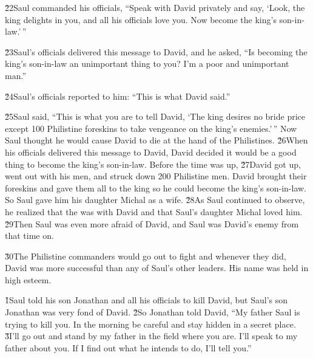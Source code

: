 \v{22}Saul commanded his officials, ``Speak with David privately and say, `Look, the king delights in you, and all his officials love you. Now become the king's son-in-law.'\,''

\v{23}Saul's officials delivered this message to David, and he asked, ``Is becoming the king's son-in-law an unimportant thing to you? I'm a poor and unimportant man.''

\v{24}Saul's officials reported to him: ``This is what David said.''

\v{25}Saul said, ``This is what you are to tell David, `The king desires no bride price except 100 Philistine foreskins to take vengeance on the king's enemies.'\,'' Now Saul thought he would cause David to die at the hand of the Philistines. \v{26}When his officials delivered this message to David, David decided it would be a good thing to become the king's son-in-law. Before the time was up, \v{27}David got up, went out with his men, and struck down 200 Philistine men. David brought their foreskins and gave them all to the king so he could become the king's son-in-law. So Saul gave him his daughter Michal as a wife. \v{28}As Saul continued to observe, he realized that the  was with David and that Saul's daughter Michal loved him. \v{29}Then Saul was even more afraid of David, and Saul was David's enemy from that time on.

\v{30}The Philistine commanders would go out to fight and whenever they did, David was more successful than any of Saul's other leaders. His name was held in high esteem.

\v{1}Saul told his son Jonathan and all his officials to kill David, but Saul's son Jonathan was very fond of David. \v{2}So Jonathan told David, ``My father Saul is trying to kill you. In the morning be careful and stay hidden in a secret place. \v{3}I'll go out and stand by my father in the field where you are. I'll speak to my father about you. If I find out what he intends to do, I'll tell you.''

